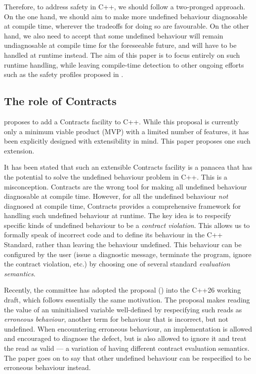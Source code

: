 Therefore, to address safety in C++, we should follow a two-pronged approach. On the one hand, we should aim to make more undefined behaviour diagnosable at compile time, wherever the tradeoffs for doing so are favourable. On the other hand, we also need to accept that some undefined behaviour will remain undiagnosable at compile time for the foreseeable future, and will have to be handled at runtime instead. The aim of this paper is to focus entirely on such runtime handling, while leaving compile-time detection to other ongoing efforts such as the safety profiles proposed in \cite{P2687R0}.

\subsection{The role of Contracts}

\cite{P2900R7} proposes to add a Contracts facility to C++. While this proposal is currently only a minimum viable product (MVP) with a limited number of features, it has been explicitly designed with extensibility in mind. This paper proposes one such extension.

It has been stated that such an extensible Contracts facility is a panacea that has the potential to solve the undefined behaviour problem in C++. This is a misconception. Contracts are the wrong tool for making all undefined behaviour diagnosable at compile time. However, for all the undefined behaviour \emph{not} diagnosed at compile time, Contracts provides a comprehensive framework for handling such undefined behaviour at runtime. The key idea is to respecify specific kinds of undefined behaviour to be a \emph{contract violation}. This allows us to formally speak of incorrect code and to define its behaviour in the C++ Standard, rather than leaving the behaviour undefined. This behaviour can be configured by the user (issue a diagnostic message, terminate the program, ignore the contract violation, etc.) by choosing one of several standard \emph{evaluation semantics}.

Recently, the committee has adopted the proposal (\cite{P2795R5}) into the C++26 working draft, which follows essentially the same motivation. The proposal makes reading the value of an uninitialised variable well-defined by respecifying such reads as \emph{erroneous behaviour}, another term for behaviour that is incorrect, but not undefined. When encountering erroneous behaviour, an implementation is allowed and encouraged to diagnose the defect, but is also allowed to ignore it and treat the read as valid --- a variation of having different contract evaluation semantics. The paper goes on to say that other undefined behaviour can be respecified to be erroneous behaviour instead.

